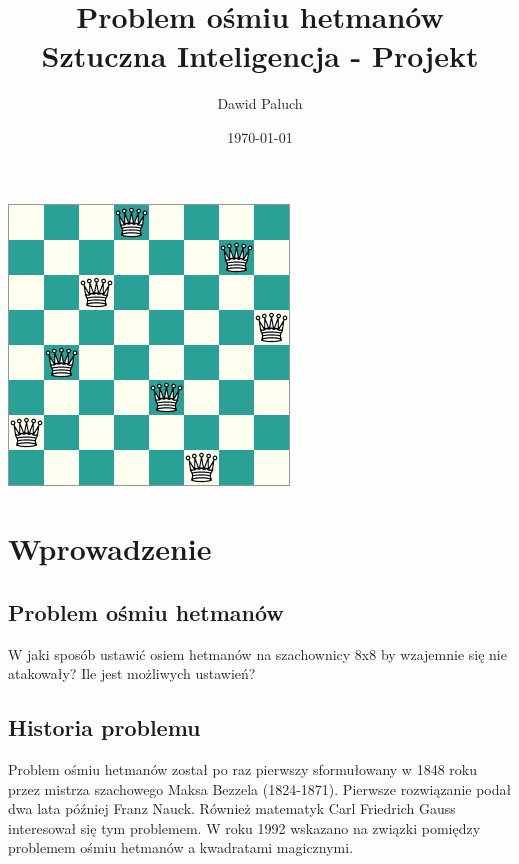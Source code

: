 \documentclass[12pt, twoside]{article}
\begin{document}
\title{\vspace{50mm}Problem ośmiu hetmanów \\
    \large Sztuczna Inteligencja - Projekt  
}

\author{Dawid Paluch}
\date{\today}
\maketitle

\begin{center}
    \includegraphics[keepaspectratio=true, scale=0.6]{8queens.png}
\end{center}
\thispagestyle{empty}
\clearpage
\setcounter{page}{1}

\clearpage
\tableofcontents
\clearpage

\setcounter{page}{3}
\section{Wprowadzenie}

\subsection{Problem ośmiu hetmanów}
W jaki sposób ustawić osiem hetmanów na szachownicy 8x8 by wzajemnie się nie atakowały? Ile jest możliwych ustawień?

\subsection{Historia problemu}
Problem ośmiu hetmanów został po raz pierwszy sformułowany w 1848 roku przez mistrza szachowego Maksa Bezzela (1824-1871). Pierwsze rozwiązanie podał dwa lata później Franz Nauck. Również matematyk Carl Friedrich Gauss interesował się tym problemem. W roku 1992 wskazano na związki pomiędzy problemem ośmiu hetmanów a kwadratami magicznymi.
\end{document}
